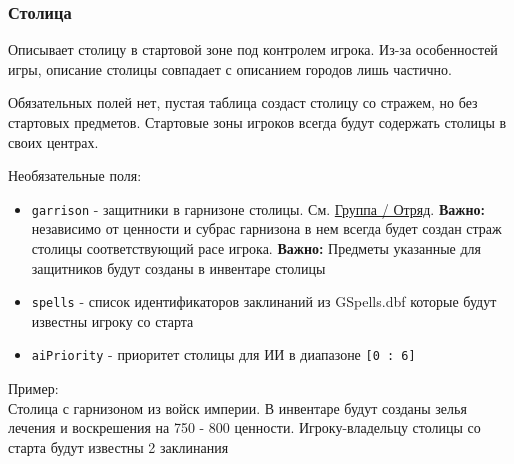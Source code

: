 \subsubsection{Столица}
\label{capital}
Описывает столицу в стартовой зоне под контролем игрока. Из-за особенностей игры, описание столицы совпадает с описанием городов лишь частично.

Обязательных полей нет, пустая таблица создаст столицу со стражем, но без стартовых предметов. Стартовые зоны игроков всегда будут содержать столицы в своих центрах.

Необязательные поля:
\begin{itemize}
\item \texttt{garrison} - защитники в гарнизоне столицы. См. \hyperref[group]{Группа / Отряд}. \textbf{Важно:} независимо от ценности и субрас гарнизона в нем всегда будет создан страж столицы соответствующий расе игрока. \textbf{Важно:} Предметы указанные для защитников будут созданы в инвентаре столицы
\item \texttt{spells} - список идентификаторов заклинаний из GSpells.dbf которые будут известны игроку со старта
\item \texttt{aiPriority} - приоритет столицы для ИИ в диапазоне \texttt{[0 : 6]}
\end{itemize}

Пример:\\
Столица с гарнизоном из войск империи.
В инвентаре будут созданы зелья лечения и воскрешения на 750 - 800 ценности.
Игроку-владельцу столицы со старта будут известны 2 заклинания

\begin{figure}[H]

\end{figure}